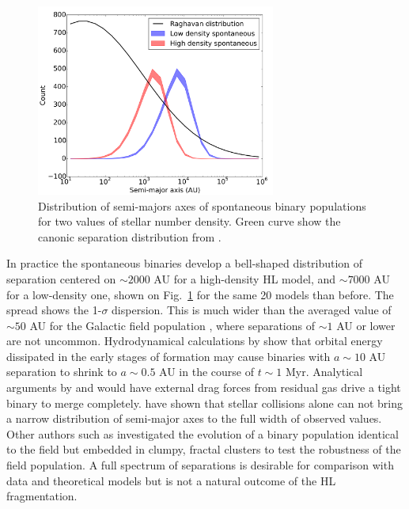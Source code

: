 \begin{figure}
\begin{center}
\includegraphics[width=0.7\textwidth]{Figures/5_spontaneous_smaxis}
\caption{Distribution of semi-majors axes of spontaneous binary populations for two values of stellar number density. Green curve show the canonic separation distribution from \protect\cite{Raghavan2010}. }
\label{Fig:5_spontaneous_smaxis}
\end{center}
\end{figure}


In practice the spontaneous binaries develop a bell-shaped  distribution of separation centered on $\sim 2000$ AU for a high-density HL model,  and $\sim 7000$ AU for a low-density one, shown on Fig.~\ref{Fig:5_spontaneous_smaxis} for the same 20 models than before. The spread shows the 1-$\sigma$ dispersion. This is much wider than the averaged value of $\sim 50$ AU for the Galactic field population \citep{DM91,Raghavan2010}, where separations of $\sim 1 $ AU or lower are not uncommon. Hydrodynamical calculations by \cite{Bate2012} show that orbital energy dissipated in the early stages of formation may cause binaries with $ a \sim 10 $ AU  separation to shrink to $ a \sim  0.5 $ AU in the course of $t \sim 1 $ Myr. Analytical arguments by \cite{Stahler2010} and \cite{Korntreff2012} would have external drag forces from residual gas drive a tight binary to merge completely. \cite{Kroupa2001} have shown that stellar collisions  alone can not bring a narrow distribution of semi-major axes to the full width of observed values. Other authors such as \cite{Parker2014} investigated the evolution of a binary population identical to the field but embedded in clumpy, fractal clusters \citep{Goodwin2004} to test the robustness of the field population. 
A full spectrum of separations is desirable for comparison with data and theoretical models but is not a  natural outcome of the HL fragmentation. 

